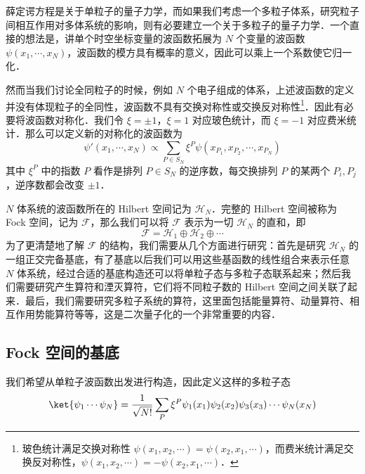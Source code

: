 

薛定谔方程是关于单粒子的量子力学，而如果我们考虑一个多粒子体系，研究粒子间相互作用对多体系统的影响，则有必要建立一个关于多粒子的量子力学．一个直接的想法是，讲单个时空坐标变量的波函数拓展为 $N$ 个变量的波函数 $\psi(x_1,\cdots,x_N)$，波函数的模方具有概率的意义，因此可以乘上一个系数使它归一化．

然而当我们讨论全同粒子的时候，例如 $N$ 个电子组成的体系，上述波函数的定义并没有体现粒子的全同性，波函数不具有交换对称性或交换反对称性\footnote{玻色统计满足交换对称性 $\psi(x_1,x_2,\cdots)=\psi(x_2,x_1,\cdots)$，而费米统计满足交换反对称性，$\psi(x_1,x_2,\cdots)=-\psi(x_2,x_1,\cdots)$．}．因此有必要将波函数对称化．我们令 $\xi=\pm 1$，$\xi=1$ 对应玻色统计，而 $\xi=-1$ 对应费米统计．那么可以定义新的对称化的波函数为
\begin{equation}
\psi'(x_1,\cdots,x_N)\propto \sum_{P\in S_N} \xi^P \psi(x_{P_1},x_{P_2},\cdots,x_{P_N})
\end{equation}
其中 $\xi^P$ 中的指数 $P$ 看作是排列 $P\in S_N$ 的逆序数，每交换排列 $P$ 的某两个 $P_i,P_j$，逆序数都会改变 $\pm 1$．

$N$ 体系统的波函数所在的 Hilbert 空间记为 $\mathcal{H}_N$．完整的 Hilbert 空间被称为 Fock 空间，记为 $\mathcal{F}$，那么我们可以将 $\mathcal{F}$ 表示为一切 $\mathcal{H}_N$ 的直和，即
\begin{equation}
\mathcal{F}=\mathcal{H}_1 \oplus \mathcal{H}_2 \oplus \cdots
\end{equation}
为了更清楚地了解 $\mathcal{F}$ 的结构，我们需要从几个方面进行研究：首先是研究 $\mathcal{H}_N$ 的一组正交完备基底，有了基底以后我们可以用这些基函数的线性组合来表示任意 $N$ 体系统，经过合适的基底构造还可以将单粒子态与多粒子态联系起来；然后我们需要研究产生算符和湮灭算符，它们将不同粒子数的 Hilbert 空间之间关联了起来．最后，我们需要研究多粒子系统的算符，这里面包括能量算符、动量算符、相互作用势能算符等等，这是二次量子化的一个非常重要的内容．
\subsection{Fock 空间的基底}
我们希望从单粒子波函数出发进行构造，因此定义这样的多粒子态
\begin{equation}
\ket{\psi_1\cdots\psi_N}=\frac{1}{\sqrt{N!}}\sum_P \xi^P\psi_1(x_1)\psi_2(x_2)\psi_3(x_3)\cdots \psi_N(x_N)
\end{equation}
